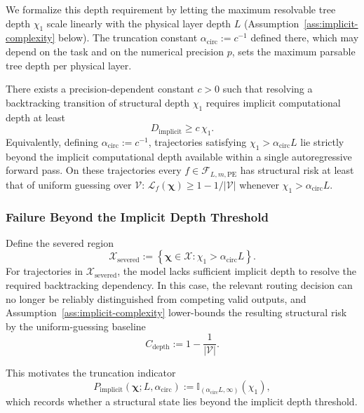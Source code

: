 We formalize this depth requirement by letting the maximum resolvable tree depth $\chi_1$ scale linearly with the physical layer depth $L$ (Assumption~\ref{ass:implicit-complexity} below). The truncation constant $\alpha_{\mathrm{circ}}:=c^{-1}$ defined there, which may depend on the task and on the numerical precision $p$, sets the maximum parsable tree depth per physical layer.

\begin{assumption}
\label{ass:implicit-complexity}
There exists a precision-dependent constant $c>0$ such that resolving a backtracking transition of structural depth $\chi_1$ requires implicit computational depth at least
\begin{equation}
D_{\mathrm{implicit}} \ge c\,\chi_1.
\end{equation}
Equivalently, defining $\alpha_{\mathrm{circ}}:=c^{-1}$, trajectories satisfying $\chi_1>\alpha_{\mathrm{circ}}L$ lie strictly beyond the implicit computational depth available within a single autoregressive forward pass. On these trajectories every $f\in\mathcal{F}_{L,m,\mathrm{PE}}$ has structural risk at least that of uniform guessing over $\mathcal{V}$: $\mathcal{L}_f(\boldsymbol{\chi})\ge 1-1/|\mathcal{V}|$ whenever $\chi_1>\alpha_{\mathrm{circ}}L$.
\end{assumption}

\subsubsection{Failure Beyond the Implicit Depth Threshold}
\label{app:depth-threshold-failure}

Define the severed region
\begin{equation}
\mathcal{X}_{\mathrm{severed}}
:=
\left\{
\boldsymbol{\chi}\in\mathcal{X}:\chi_1>\alpha_{\mathrm{circ}}L
\right\}.
\end{equation}
For trajectories in $\mathcal{X}_{\mathrm{severed}}$, the model lacks sufficient implicit depth to resolve the required backtracking dependency. In this case, the relevant routing decision can no longer be reliably distinguished from competing valid outputs, and Assumption~\ref{ass:implicit-complexity} lower-bounds the resulting structural risk by the uniform-guessing baseline
\begin{equation}
C_{\mathrm{depth}}:=1-\frac{1}{|\mathcal{V}|}.
\end{equation}

This motivates the truncation indicator
\begin{equation}
P_{\mathrm{implicit}}(\boldsymbol{\chi};L,\alpha_{\mathrm{circ}})
:=
\mathbb{I}_{(\alpha_{\mathrm{circ}}L,\infty)}(\chi_1),
\end{equation}
which records whether a structural state lies beyond the implicit depth threshold.

